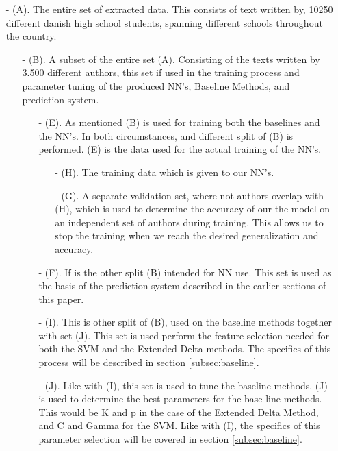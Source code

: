 \begin{itemize}

\item[- (A).] The entire set of extracted data. This consists of text written
by, 10250 different danish high school students, spanning different schools
throughout the country.

\begin{itemize}

\item[- (B).] 
A subset of the entire set (A). Consisting of the texts written by
3.500 different authors, this set if used in the training process and parameter
tuning of the produced \gls{NN}'s, Baseline Methods, and prediction system.

\begin{itemize}

\item[- (E).] As mentioned (B) is used for training both the baselines and the 
\gls{NN}'s. In both circumstances, and different split of (B) is performed.
(E) is the data used for the actual training of the \gls{NN}'s.


\begin{itemize}
\item[- (H).] The training data which is given to our \gls{NN}'s.

\item[- (G).] A separate validation set, where not authors overlap with (H), which
is used to determine the accuracy of our the model on an independent set of
authors during training. This allows us to stop the training when we reach
the desired generalization and accuracy.

\end{itemize}


\item[- (F).] If is the other split (B) intended for \gls{NN} use. This set is
used as the basis of the prediction system described in the earlier 
sections of this paper.

\item[- (I).] This is other split of (B), used on the baseline methods together
with set (J). This set is used perform the feature selection needed for both
the SVM and the Extended Delta methods. The specifics of this process will be
described in section \ref{subsec:baseline}.

\item[- (J).] Like with (I), this set is used to tune the baseline methods. (J) is
used to determine the best parameters for the base line methods. This would be K
and p in the case of the Extended Delta Method, and C and Gamma for the SVM.
Like with (I), the specifics of this parameter selection will be covered in
section \ref{subsec:baseline}.


\end{itemize}
\end{itemize}
\end{itemize}
